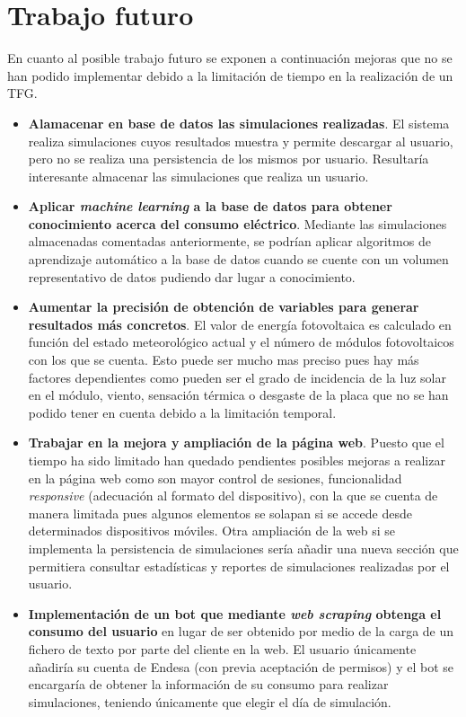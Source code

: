 \section{Trabajo futuro}
En cuanto al posible trabajo futuro se exponen a continuación mejoras que no se han podido implementar debido a la limitación de tiempo en la realización de un \gls{TFG}.
\begin{itemize}
\item \textbf{Alamacenar en base de datos las simulaciones realizadas}. El sistema realiza simulaciones cuyos resultados muestra y permite descargar al usuario, pero no se realiza una persistencia de los mismos por usuario. Resultaría interesante almacenar las simulaciones que realiza un usuario.
\item \textbf{Aplicar \textit{machine learning} a la base de datos para obtener conocimiento acerca del consumo eléctrico}. Mediante las simulaciones almacenadas comentadas anteriormente, se podrían aplicar algoritmos de aprendizaje automático a la base de datos cuando se cuente con un volumen representativo de datos pudiendo dar lugar a conocimiento.
\item \textbf{Aumentar la precisión de obtención de variables para generar resultados más concretos}. El valor de energía fotovoltaica es calculado en función del estado meteorológico actual y el número de módulos fotovoltaicos con los que se cuenta. Esto puede ser mucho mas preciso pues hay más factores dependientes como pueden ser el grado de incidencia de la luz solar en el módulo, viento, sensación térmica o desgaste de la placa que no se han podido tener en cuenta debido a la limitación temporal.
\item \textbf{Trabajar en la mejora y ampliación de la página web}. Puesto que el tiempo ha sido limitado han quedado pendientes posibles mejoras a realizar en la página web como son mayor control de sesiones, funcionalidad \textit{responsive} (adecuación al formato del dispositivo), con la que se cuenta de manera limitada pues algunos elementos se solapan si se accede desde determinados dispositivos móviles. Otra ampliación de la web si se implementa la persistencia de simulaciones sería añadir una nueva sección que permitiera consultar estadísticas y reportes de simulaciones realizadas por el usuario.
\item \textbf{Implementación de un bot que mediante \textit{web scraping} obtenga el consumo del usuario} en lugar de ser obtenido por medio de la carga de un fichero de texto por parte del cliente en la web. El usuario únicamente añadiría su cuenta de Endesa (con previa aceptación de permisos) y el bot se encargaría de obtener la información de su consumo para realizar simulaciones, teniendo únicamente que elegir el día de simulación.
\end{itemize}
